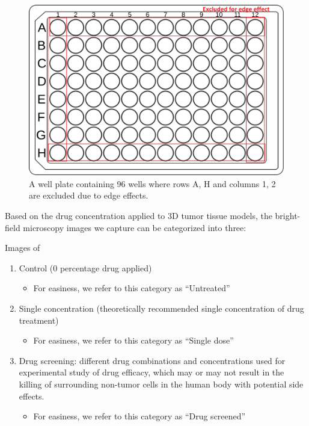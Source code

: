 \documentclass[12pt,twoside,a4paper,parskip]{scrbook} %
\begin{document}
\begin{figure}[H]
  \centering
  \includegraphics[width=0.9\linewidth]{figures/WellPlate.png} %
  \caption{A well plate containing 96 wells where rows A, H and columns 1, 2 are excluded due to edge effects.}
  \label{fig:Wellplate}
\end{figure}





Based on the drug concentration applied to 3D tumor tissue models, the bright-field microscopy images we capture can be categorized into three:

Images of

\begin{enumerate}
  \item Control (0 percentage drug applied)
        \begin{itemize}
            \item For easiness, we refer to this category as ``Untreated''
        \end{itemize}
  
  \item Single concentration (theoretically recommended single concentration of drug treatment)
        \begin{itemize}
            \item For easiness, we refer to this category as ``Single dose''
        \end{itemize}
  \item Drug screening: different drug combinations and concentrations used for experimental study of drug efficacy, which may or may not result in the killing of surrounding non-tumor cells in the human body with potential side effects.
        \begin{itemize}
            \item For easiness, we refer to this category as ``Drug screened''
        \end{itemize}
\end{enumerate}
\end{document}
